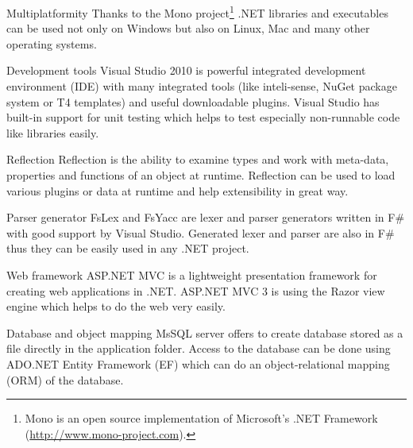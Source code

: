 \begin{description*}
	\item[Multiplatformity]
		Thanks to the Mono project\footnote{Mono is an open source implementation of Microsoft's .NET Framework (\url{http://www.mono-project.com}).}
			.NET libraries and executables can be used not only on Windows but also on Linux, Mac and many other operating systems.
	\item[Development tools]
		Visual Studio 2010 is powerful integrated development environment (IDE) with many integrated tools (like inteli-sense, NuGet package system or T4 templates) and useful downloadable plugins.
		Visual Studio has built-in support for unit testing which helps to test especially non-runnable code like libraries easily.
	\item[Reflection]
		Reflection is the ability to examine types and work with meta-data, properties and functions of an object at runtime.
		Reflection can be used to load various plugins or data at runtime and help extensibility in great way.
	\item[Parser generator]
		FsLex and FsYacc are lexer and parser generators written in F\# with good support by Visual Studio.
		Generated lexer and parser are also in F\# thus they can be easily used in any .NET project.
	\item[Web framework]
		ASP.NET MVC is a lightweight presentation framework for creating web applications in .NET.
		ASP.NET MVC 3 is using the Razor view engine which helps to do the web very easily.
	\item[Database and object mapping]
		MsSQL server offers to create database stored as a file directly in the application folder.
		Access to the database can be done using ADO.NET Entity Framework (EF) which can do an object-relational mapping (ORM) of the database.
\end{description*}




\clearpage


\clearpage


















